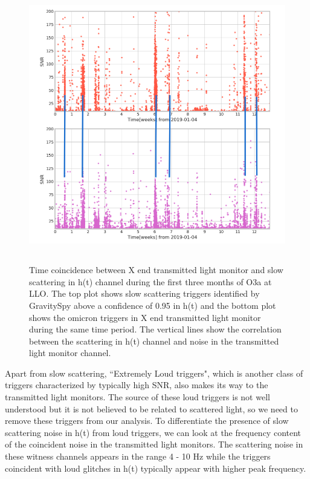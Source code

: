 \documentclass[12pt]{iopart}
\begin{document}
\begin{figure}[h]
  \centering
         \includegraphics[width = 14cm,height=12cm]{htxtrb_corr5.png}
         \caption{Time coincidence between X end transmitted light monitor and slow scattering in h(t) channel during the first three months of O3a at LLO. The top plot shows slow scattering triggers identified by GravitySpy above a confidence of 0.95 in h(t) and the bottom plot shows the omicron triggers in X end transmitted light monitor during the same time period. The vertical lines show the correlation between the scattering in h(t) channel and noise in the transmitted light monitor channel.}
    \label{fig:transetmx}
\end{figure}

Apart from slow scattering, ``Extremely Loud triggers", which is another class of triggers characterized by typically high SNR, also makes its way to the transmitted light monitors. The source of these loud triggers is not well understood but it is not believed to be related to scattered light, so we need to remove these triggers from our analysis. To differentiate the presence of slow scattering noise in h(t) from loud triggers, we can look at the frequency content of the coincident noise in the transmitted light monitors. The scattering noise in these witness channels appears in the range  4 - 10 Hz while the triggers coincident with loud glitches in h(t) typically appear with higher peak frequency. 
\end{document}
